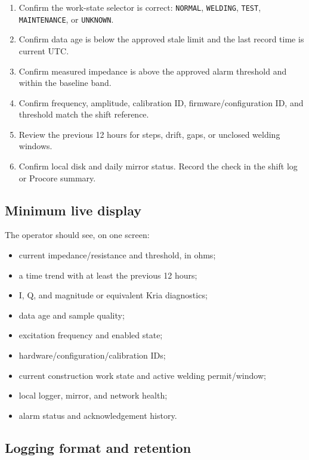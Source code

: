 \documentclass[11pt]{article}
\begin{document}
\begin{enumerate}
  \item Confirm the work-state selector is correct: \texttt{NORMAL}, \texttt{WELDING}, \texttt{TEST}, \texttt{MAINTENANCE}, or \texttt{UNKNOWN}.
  \item Confirm data age is below the approved stale limit and the last record time is current UTC.
  \item Confirm measured impedance is above the approved alarm threshold and within the baseline band.
  \item Confirm frequency, amplitude, calibration ID, firmware/configuration ID, and threshold match the shift reference.
  \item Review the previous 12 hours for steps, drift, gaps, or unclosed welding windows.
  \item Confirm local disk and daily mirror status. Record the check in the shift log or Procore summary.
\end{enumerate}

\subsection{Minimum live display}

The operator should see, on one screen:

\begin{itemize}
  \item current impedance/resistance and threshold, in ohms;
  \item a time trend with at least the previous 12 hours;
  \item I, Q, and magnitude or equivalent Kria diagnostics;
  \item data age and sample quality;
  \item excitation frequency and enabled state;
  \item hardware/configuration/calibration IDs;
  \item current construction work state and active welding permit/window;
  \item local logger, mirror, and network health;
  \item alarm status and acknowledgement history.
\end{itemize}

\subsection{Logging format and retention}
\end{document}
